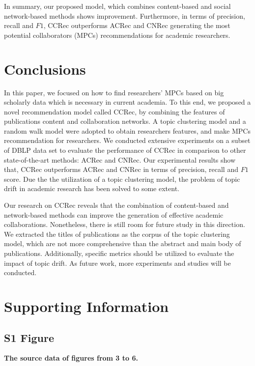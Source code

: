 \documentclass[10pt,letterpaper]{article}
\begin{document}
In summary, our proposed model, which combines content-based and social network-based methods shows improvement. Furthermore, in terms of precision, recall and $F1$, CCRec outperforms ACRec and CNRec generating the most potential collaborators (MPCs) recommendations for academic researchers.

\section*{Conclusions}
In this paper, we focused on how to find researchers' MPCs based on big scholarly data which is necessary in current academia. To this end, we proposed a novel recommendation model called CCRec, by combining the features of publications content and collaboration networks. A topic clustering model and a random walk model were adopted to obtain researchers features, and make MPCs recommendation for researchers. We conducted extensive experiments on a subset of DBLP data set to evaluate the performance of CCRec in comparison to other state-of-the-art methods: ACRec and CNRec. Our experimental results show that, CCRec outperforms ACRec and CNRec in terms of precision, recall and $F1$ score. Due the the utilization of a topic clustering model, the problem of topic drift in academic research has been solved to some extent.

Our research on CCRec reveals that the combination of content-based and network-based methods can improve the generation of effective academic collaborations. Nonetheless, there is still room for future study in this direction. We extracted the titles of publications as the corpus of the topic clustering model, which are not more comprehensive than the abstract and main body of publications. Additionally, specific metrics should be utilized to evaluate the impact of topic drift. As future work, more experiments and studies will be conducted.

\section*{Supporting Information}

\subsection*{S1 Figure}
\label{S1_Figures}
{\bf The source data of figures from 3 to 6.}
\end{document}
